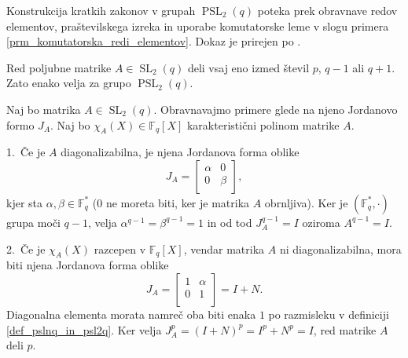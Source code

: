     Konstrukcija kratkih zakonov v grupah $\operatorname{PSL}_2(q)$ poteka prek obravnave redov elementov, praštevilskega izreka in uporabe komutatorske leme v slogu primera \ref{prm_komutatorska_redi_elementov}.
    Dokaz je prirejen po \cite[str.~36--37]{Schneider_2016}.
    \begin{lema}
    \label{lem_redi_elementov_v_psl2q}
    Red poljubne matrike $A \in  \operatorname{SL}_2(q)$ deli vsaj eno izmed števil $p$, $q-1$ ali $q + 1$. Zato enako velja za grupo $\operatorname{PSL}_2(q)$. 
    \end{lema}
    \begin{dokaz}
    Naj bo matrika $A \in \operatorname{SL}_2(q)$. Obravnavajmo primere glede na njeno Jordanovo formo $J_A$. Naj bo $\chi_A(X) \in \mathbb{F}_q[X]$ karakteristični polinom matrike $A$. 
    
    1.~Če je $A$ diagonalizabilna, je njena Jordanova forma oblike \begin{equation*}
        J_A = \begin{bmatrix}
            \alpha & 0 \\
            0 & \beta \\
        \end{bmatrix},
        \end{equation*}  
          kjer sta $\alpha, \beta \in  \mathbb{F}_q^{*}$ (0 ne moreta biti, ker je matrika $A$ obrnljiva). Ker je $(\mathbb{F}_q^{*}, \cdot)$ grupa moči $q-1$, velja $\alpha^{q-1} = \beta^{q -1} = 1$ in od tod $J_A^{q-1} = I$ oziroma $A^{q-1} = I$.
    
     2.~Če je $\chi_A(X)$ razcepen v $\mathbb{F}_q[X]$, vendar matrika $A$ ni diagonalizabilna, mora biti njena Jordanova forma oblike \begin{equation*}
          J_A =  \begin{bmatrix}
            1 & \alpha\\
            0 & 1\\
          \end{bmatrix} = I + N.
          \end{equation*}  
        Diagonalna elementa morata namreč oba biti enaka $1$ po razmisleku v definiciji \ref{def_pslnq_in_psl2q}. Ker velja $J_A^{p} = (I + N)^{p} = I^{p} + N^{p} = I$, red matrike $A$ deli $p$.  
    

\end{dokaz}
